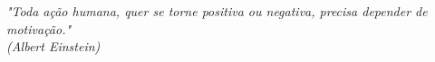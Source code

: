 \begin{epigrafe}
    \vspace*{\fill}
	\begin{flushright}
		\textit{"Toda ação humana, quer se torne positiva ou negativa, precisa depender de motivação."\\
		(Albert Einstein)}
	\end{flushright}
\end{epigrafe}

